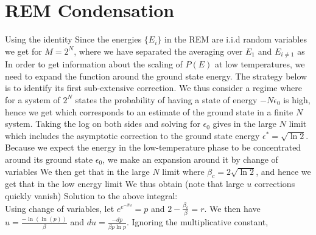 \documentclass[letterpaper,english,10pt]{article}
\begin{document}
\section{REM Condensation}
\label{appendix:Condensation}
Using the identity 
Since the energies $\{E_i\}$ in the REM  are i.i.d random variables we get for $M = 2^N$,
where we have separated the averaging over $E_1$ and $E_{i \neq1}$ as 
In order to get information about the scaling of $P(E)$ at low temperatures, 
we need to expand the function around the ground state energy. 
The strategy below is to identify its first sub-extensive correction. 
We thus consider a regime where for a system of $2^N$ states the probability of having a state of energy $-N\epsilon_0$ is high, hence we get 
which corresponds to an estimate of the ground state in a finite $N$ system. 
Taking the log on both sides and solving for $\epsilon_0$ gives in the large $N$ limit 
 which includes the asymptotic correction to the ground state energy $\epsilon^\ast = \sqrt{\ln 2}$. 
Because we expect the energy in the low-temperature phase to be concentrated around its ground
state $\epsilon_0$, we make an expansion around it by change of variables 
We then get that in the large $N$ limit 
where $\beta_c = 2\sqrt{\ln2}$, and hence we get that in the low energy limit 
We thus obtain (note that large $u$ corrections quickly vanish) 
Solution to the above integral:\\
Using change of variables, let $e^{e^{-\beta u}} = p$ and $2 - \frac{\beta_c}{\beta}= r$. We then have $u = \frac{-\ln(\ln(p))}{\beta}$ and $du = \frac{- dp}{\beta p \ln p}$. Ignoring the multiplicative constant,\\
\end{document}
